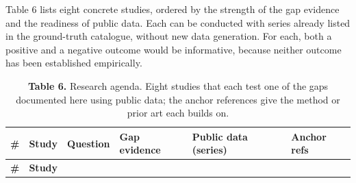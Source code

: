 \documentclass{article}
\begin{document}
Table 6 lists eight concrete studies, ordered by the strength of the gap
evidence and the readiness of public data. Each can be conducted with
series already listed in the ground-truth catalogue, without new data
generation. For each, both a positive and a negative outcome would be
informative, because neither outcome has been established empirically.



\begin{longtable}[l]{@{}
  >{\raggedright\arraybackslash}p{}
  >{\raggedright\arraybackslash}p{}
  >{\raggedright\arraybackslash}p{}
  >{\raggedright\arraybackslash}p{}
  >{\raggedright\arraybackslash}p{}
  >{\raggedright\arraybackslash}p{}@{}}
\caption{\textbf{Table 6.} Research agenda. Eight studies that each test one of
the gaps documented here using public data; the anchor references give
the method or prior art each builds on.}\tabularnewline
\toprule
\begin{minipage}[b]{\linewidth}\raggedright
\textbf{\#}
\end{minipage} & \begin{minipage}[b]{\linewidth}\raggedright
\textbf{Study}
\end{minipage} & \begin{minipage}[b]{\linewidth}\raggedright
\textbf{Question}
\end{minipage} & \begin{minipage}[b]{\linewidth}\raggedright
\textbf{Gap evidence}
\end{minipage} & \begin{minipage}[b]{\linewidth}\raggedright
\textbf{Public data (series)}
\end{minipage} & \begin{minipage}[b]{\linewidth}\raggedright
\textbf{Anchor refs}
\end{minipage} \\
\midrule
\endfirsthead
\toprule
\begin{minipage}[b]{\linewidth}\raggedright
\textbf{\#}
\end{minipage} & \begin{minipage}[b]{\linewidth}\raggedright
\textbf{Study}
\end{minipage} & \begin{minipage}[b]{\linewidth}\raggedright

\end{minipage}
\end{longtable}
\end{document}
